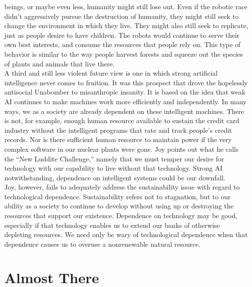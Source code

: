 beings, or maybe even less, humanity might still lose out. Even if the robotic race didn’t
aggressively pursue the destruction of humanity, they might still seek to change the
environment in which they live. They might also still seek to replicate, just as people
desire to have children. The robots would continue to serve their own best interests, and
consume the resources that people rely on. This type of behavior is similar to the way
people harvest forests and squeeze out the species of plants and animals that live there.\\
A third and still less violent future view is one in which strong artificial
intelligence never comes to fruition. It was this prospect that drove the hopelessly
antisocial Unabomber to misanthropic insanity. It is based on the idea that weak AI
continues to make machines work more efficiently and independently. In many ways, we
as a society are already dependent on these intelligent machines. There is not, for
example, enough human resource available to sustain the credit card industry without the
intelligent programs that rate and track people’s credit records. Nor is there sufficient human resource to maintain power if the very complex software in our nuclear plants
were gone. Joy points out what he calls the “New Luddite Challenge,” namely that we
must temper our desire for technology with our capability to live without that technology.
Strong AI notwithstanding, dependence on intelligent systems could be our downfall.\\
Joy, however, fails to adequately address the sustainability issue with regard to
technological dependence. Sustainability refers not to stagnation, but to our ability as a
society to continue to develop without using up or destroying the resources that support
our existence. Dependence on technology may be good, especially if that technology
enables us to extend our banks of otherwise depleting resources. We need only be wary
of technological dependence when that dependence causes us to overuse a nonrenewable
natural resource.
\section{Almost There}

